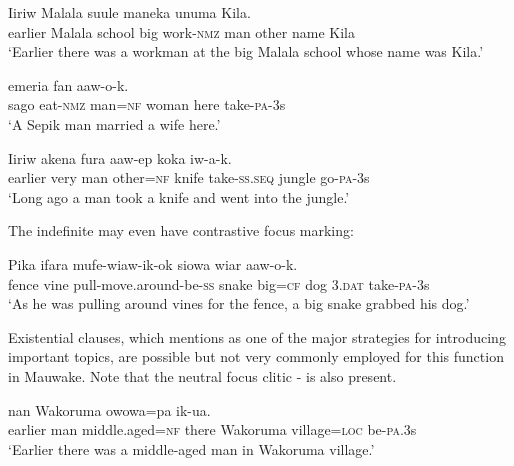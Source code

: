 \ea%
\label{ex:9:x1669}
\gll Iiriw  Malala  suule  maneka       unuma  Kila. \\
earlier  Malala  school  big  work-\textsc{nmz}  man  other  name  Kila \\
\glt`Earlier there was a workman at the big Malala school whose name was Kila.'
\z


\ea%
\label{ex:9:x1670}
\gll {}      emeria  fan  aaw-o-k.\\
sago  eat-\textsc{nmz}  man=\textsc{nf}  woman  here  take-\textsc{pa}-3s\\
\glt`A Sepik man married a wife here.'
\z


\ea%
\label{ex:9:x1671}
\gll Iiriw  akena     fura  aaw-ep  koka  iw-a-k.\\
earlier  very  man  other=\textsc{nf}  knife  take-\textsc{ss}.\textsc{seq}  jungle  go-\textsc{pa}-3s      \\
\glt`Long ago a man took a knife and went into the jungle.'
\z


The indefinite  may even have contrastive focus marking:

\ea%
\label{ex:9:x1666}
\gll Pika  ifara  mufe-wiaw-ik-ok     siowa wiar  aaw-o-k. \\
fence  vine  pull-move.around-be-\textsc{ss}  snake  big=\textsc{cf}  dog 3.\textsc{dat}  take-\textsc{pa}-3s\\
\glt`As he was pulling around vines for the fence, a big snake grabbed his dog.'
\z


Existential clauses, which \citet[741]{Givon1990} mentions as one of the major strategies for introducing important topics, are possible but not very commonly employed for this function in Mauwake. Note that the neutral focus clitic - is also present.

\ea%
\label{ex:9:x1672}
\gll {}     nan  Wakoruma  owowa=pa  ik-ua.\\
earlier  man  middle.aged=\textsc{nf}  there  Wakoruma  village=\textsc{loc}  be-\textsc{pa}.3s      \\
\glt`Earlier there was a middle-aged man in Wakoruma village.'
\z



